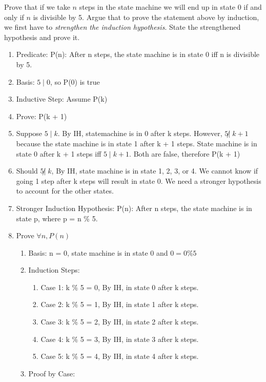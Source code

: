 \documentclass[11pt]{article}
\begin{document}
\begin{enumerate}
        Prove that if we take $n$ steps in the state machine we will end up in state 0 if and only if $n$ is divisible by 5. Argue that to prove the statement above by induction, we first have to {\it strengthen the induction hypothesis}. State the strengthened hypothesis and prove it.
        \begin{enumerate}
            \item Predicate: P(n): After n steps, the state machine is in state 0 iff n is divisible by 5.
            \item Basis: $5\;|\;0$, so P(0) is true
            \item Inductive Step: Assume P(k)
            \item Prove: P(k + 1)
            \item Suppose $5\;|\;k$. By IH, statemachine is in 0 after k steps. However, $5 \not|\;k + 1$ because the state machine is in state 1 after k + 1 steps. State machine is in state 0 after k + 1 steps iff $5\;|\;k + 1$. Both are false, therefore P(k + 1)
            \item Should $5 \not|\;k$, By IH, state machine is in state 1, 2, 3, or 4. We cannot know if going 1 step after k steps will result in state 0. We need a stronger hypothesis to account for the other states.
            \item Stronger Induction Hypothesis: P(n): After n steps, the state machine is in state p, where p = n \% 5.
            \item Prove $\forall n, P(n)$
            \begin{enumerate}
                \item Basis: n = 0, state machine is in state 0 and $0 = 0 \% 5$
                \item Induction Steps:
                \begin{enumerate}
                    \item Case 1: k \% 5 = 0, By IH, in state 0 after k steps.
                    \item Case 2: k \% 5 = 1, By IH, in state 1 after k steps.
                    \item Case 3: k \% 5 = 2, By IH, in state 2 after k steps.
                    \item Case 4: k \% 5 = 3, By IH, in state 3 after k steps.
                    \item Case 5: k \% 5 = 4, By IH, in state 4 after k steps.
                \end{enumerate}
                \item Proof by Case:

\end{enumerate}
\end{enumerate}
\end{enumerate}
\end{document}
